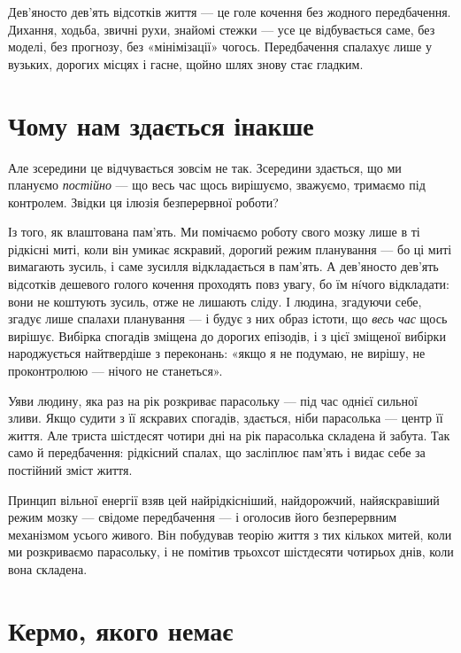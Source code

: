 \documentclass[12pt, a4paper, openany]{book}
\begin{document}
Дев'яносто дев'ять відсотків життя --- це голе кочення без жодного передбачення. Дихання, ходьба, звичні рухи, знайомі стежки --- усе це відбувається саме, без моделі, без прогнозу, без «мінімізації» чогось. Передбачення спалахує лише у вузьких, дорогих місцях і гасне, щойно шлях знову стає гладким.

\section{Чому нам здається інакше}

Але зсередини це відчувається зовсім не так. Зсередини здається, що ми плануємо \emph{постійно} --- що весь час щось вирішуємо, зважуємо, тримаємо під контролем. Звідки ця ілюзія безперервної роботи?

Із того, як влаштована пам'ять. Ми помічаємо роботу свого мозку лише в ті рідкісні миті, коли він умикає яскравий, дорогий режим планування --- бо ці миті вимагають зусиль, і саме зусилля відкладається в пам'ять. А дев'яносто дев'ять відсотків дешевого голого кочення проходять повз увагу, бо їм нíчого відкладати: вони не коштують зусиль, отже не лишають сліду. І людина, згадуючи себе, згадує лише спалахи планування --- і будує з них образ істоти, що \emph{весь час} щось вирішує. Вибірка спогадів зміщена до дорогих епізодів, і з цієї зміщеної вибірки народжується найтвердіше з переконань: «якщо я не подумаю, не вирішу, не проконтролюю --- нічого не станеться».

\begin{analogybox}
Уяви людину, яка раз на рік розкриває парасольку --- під час однієї сильної зливи. Якщо судити з її яскравих спогадів, здається, ніби парасолька --- центр її життя. Але триста шістдесят чотири дні на рік парасолька складена й забута. Так само й передбачення: рідкісний спалах, що засліплює пам'ять і видає себе за постійний зміст життя.
\end{analogybox}

Принцип вільної енергії взяв цей найрідкісніший, найдорожчий, найяскравіший режим мозку --- свідоме передбачення --- і оголосив його безперервним механізмом усього живого. Він побудував теорію життя з тих кількох митей, коли ми розкриваємо парасольку, і не помітив трьохсот шістдесяти чотирьох днів, коли вона складена.

\section{Кермо, якого немає}
\end{document}
